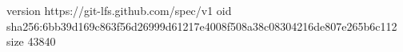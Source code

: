 version https://git-lfs.github.com/spec/v1
oid sha256:6bb39d169c863f56d26999d61217e4008f508a38c08304216de807e265b6c112
size 43840
